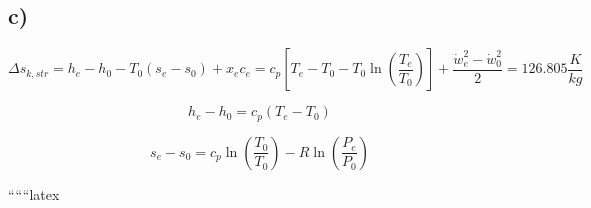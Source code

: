

\subsection*{c)}

\[
\Delta s_{k, str} = h_e - h_0 - T_0 (s_e - s_0) + x_e c_e = c_p [T_e - T_0 - T_0 \ln (\frac{T_e}{T_0})] + \frac{\dot{w}_e^2 - \dot{w}_0^2}{2} = 126.805 \frac{K}{kg}
\]

\[
h_e - h_0 = c_p (T_e - T_0)
\]

\[
s_e - s_0 = c_p \ln (\frac{T_0}{T_0}) - R \ln (\frac{P_e}{P_0})
\]

``````latex